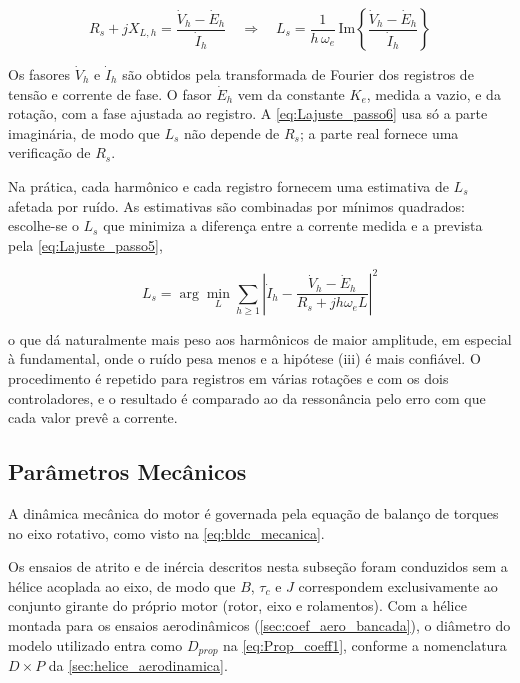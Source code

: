 \begin{equation}
    R_s + jX_{L,h} = \frac{\dot{V}_h - \dot{E}_h}{\dot{I}_h}
    \quad\Longrightarrow\quad
    L_s = \frac{1}{h\,\omega_e}\,
    \mathrm{Im}\!\left\{\frac{\dot{V}_h - \dot{E}_h}{\dot{I}_h}\right\}
    \label{eq:Lajuste_passo6}
\end{equation}

\noindent Os fasores $\dot{V}_h$ e $\dot{I}_h$ são obtidos pela transformada
de Fourier dos registros de tensão e corrente de fase. O fasor $\dot{E}_h$
vem da constante $K_e$, medida a vazio, e da rotação, com a fase ajustada ao
registro. A \autoref{eq:Lajuste_passo6} usa só a parte imaginária, de modo que
$L_s$ não depende de $R_s$; a parte real fornece uma verificação de $R_s$.

Na prática, cada harmônico e cada registro fornecem uma estimativa de $L_s$
afetada por ruído. As estimativas são combinadas por mínimos quadrados: escolhe-se
o $L_s$ que minimiza a diferença entre a corrente medida e a prevista pela
\autoref{eq:Lajuste_passo5},

\begin{equation}
    L_s = \arg\min_{L} \sum_{h \geq 1} \left|\dot{I}_h -
    \frac{\dot{V}_h - \dot{E}_h}{R_s + jh\omega_e L}\right|^2
    \label{eq:ajuste_L_harm}
\end{equation}

\noindent o que dá naturalmente mais peso aos harmônicos de maior amplitude, em especial à
fundamental, onde o ruído pesa menos e a hipótese (iii) é mais confiável. O
procedimento é repetido para registros em várias rotações e com os dois
controladores, e o resultado é comparado ao da ressonância pelo erro com que
cada valor prevê a corrente.

\subsection{Parâmetros Mecânicos}
\label{sec:params_mecanicos}

A dinâmica mecânica do motor é governada pela equação de balanço de torques no eixo rotativo, como visto na \autoref{eq:bldc_mecanica}.

Os ensaios de atrito e de inércia descritos nesta subseção foram conduzidos
sem a hélice acoplada ao eixo, de modo que $B$, $\tau_c$ e $J$ correspondem
exclusivamente ao conjunto girante do próprio motor (rotor, eixo e
rolamentos). Com a hélice montada para os ensaios aerodinâmicos
(\autoref{sec:coef_aero_bancada}), o diâmetro do modelo utilizado
entra como $D_{prop}$ na \autoref{eq:Prop_coeff1}, conforme a nomenclatura $D \times P$ da
\autoref{sec:helice_aerodinamica}.

